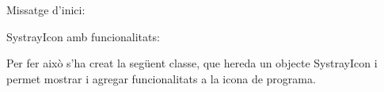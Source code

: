 \documentclass[letterpaper,11pt,catalan]{sphinxmanual}
\begin{document}
Missatge d'inici:


\begin{DUlineblock}{0em}
\item[] 
\end{DUlineblock}

SystrayIcon amb funcionalitats:


Per fer això s'ha creat la següent classe, que hereda un objecte SystrayIcon i permet
mostrar i agregar funcionalitats a la icona de programa.
\end{document}
